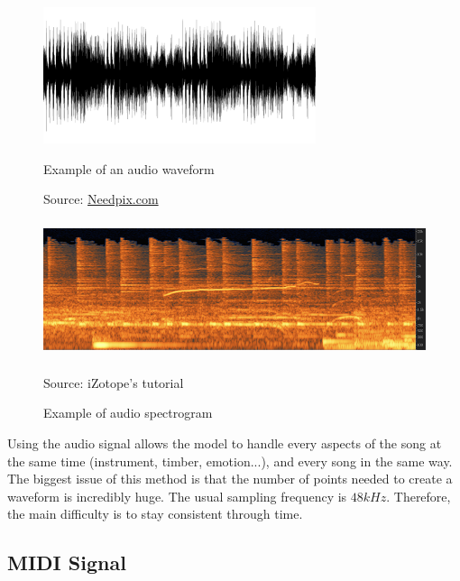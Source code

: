\documentclass[12pt]{report}
\begin{document}
\begin{figure}[H]
   \begin{minipage}{0.5\textwidth}
     \centering
     \includegraphics[width=.9\linewidth, height=4cm]{images/music/waveform/waveform.png}
     \caption{Example of an audio waveform}
     Source: \href{https://www.needpix.com/photo/856116/audio-aural-ear-hearing-music-musical-recording-silhouette-sonic}{Needpix.com}
     \label{fig:waveform_example}
   \end{minipage}\hfill
   \begin{minipage}{0.5\textwidth}
     \centering
     \includegraphics[width=\linewidth, height=4cm]{images/music/spectrogram/izotope-spectrogram.png}
     \caption{Example of audio spectrogram}
     Source: iZotope's tutorial \cite{noauthor_understanding_nodate} %
     \label{fig:spectrogram_example}
   \end{minipage}
\end{figure}

Using the audio signal allows the model to handle every aspects of the song at the same time (instrument, timber, emotion...), and every song in the same way.
The biggest issue of this method is that the number of points needed to create a waveform is incredibly huge.
The usual sampling frequency is $48kHz$. 
Therefore, the main difficulty is to stay consistent through time.

\subsection{MIDI Signal}
\end{document}
